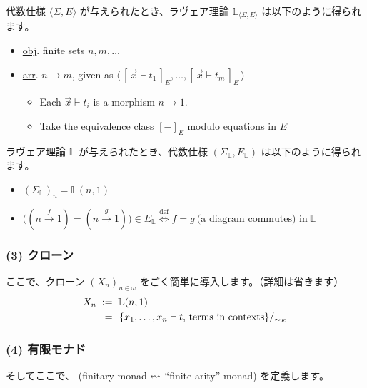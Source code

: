 \documentclass[
		head_space=20mm,
		foot_space=20mm,
		gutter=10mm,
		line_length=190mm
]{jlreq}
\begin{document}
\noindent 代数仕様 $\langle\Sigma,E\rangle$ が与えられたとき、ラヴェア理論 $\mathbb L_{\langle \Sigma,E\rangle}$ は以下のように得られます。
\begin{itemize}
	\item \underline{obj}. finite sets $n,m,\dots$
	\item \underline{arr}. $n\to m$, given as $\langle \, [\,\overset{\to}{x}\vdash t_1\,]_E,\dots,[\,\overset{\to}{x}\vdash t_m\,]_E \,\rangle$
	\begin{itemize}
		\item Each $\overset{\to}{x}\vdash t_i$ is a morphism $n\to 1$.
		\item Take the equivalence class $[-]_E$ modulo equations in $E$
	\end{itemize}
\end{itemize}

\noindent ラヴェア理論 $\mathbb L$ が与えられたとき、代数仕様 $(\Sigma_\mathbb L,E_\mathbb L)$ は以下のように得られます。
\begin{itemize}
	\item $(\Sigma_{\mathbb L})_n=\mathbb L(n,1)$
	\item $\bigl((n\xrightarrow{f} 1)=(n\xrightarrow{g} 1)\bigr)\in E_{\mathbb L}\overset{\mathrm{def}}{\iff} f=g~\textrm{(a diagram commutes) in}~\mathbb L$
\end{itemize}

\subsubsection*{(3) クローン}
\noindent ここで、クローン $(X_n)_{n\in\omega}$ をごく簡単に導入します。（詳細は省きます）
\begin{align*}
	X_n \;&:=\;\mathbb L(n,1)\\ &\;=\;\left.\{\textrm{$x_1,\dots,x_n\vdash t$, terms in contexts}\}\middle/_{\sim_E}\right.
\end{align*}

\clearpage

\subsubsection*{(4) 有限モナド}
\noindent そしてここで、 (finitary monad $\reflectbox{$\leadsto$}$ ``finite-arity'' monad) を定義します。

\end{document}
